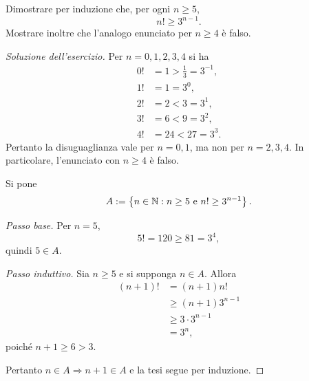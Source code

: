 \begin{exercise}
\label{ex:fondamenti-fattoriali-potenze}
Dimostrare per induzione che, per ogni $n\ge5$,
\[
  n!\ge3^{n-1}.
\]
Mostrare inoltre che l'analogo enunciato per $n\ge4$ è falso.
\end{exercise}
\begin{proof}[Soluzione dell'esercizio]
Per $n=0,1,2,3,4$ si ha
\[
\begin{aligned}
  0!&=1>\frac13=3^{-1},\\
  1!&=1=3^0,\\
  2!&=2<3=3^1,\\
  3!&=6<9=3^2,\\
  4!&=24<27=3^3.
\end{aligned}
\]
Pertanto la disuguaglianza vale per $n=0,1$,
ma non per $n=2,3,4$. In particolare,
l'enunciato con $n\ge4$ è falso.

Si pone
\[
  A:=\left\{n\in\N:n\ge5\ \text{e}\
  n!\ge3^{n-1}\right\}.
\]

\emph{Passo base.} Per $n=5$,
\[
  5!=120\ge81=3^4,
\]
quindi $5\in A$.

\emph{Passo induttivo.} Sia $n\ge5$ e si supponga $n\in A$. Allora
\[
\begin{aligned}
  (n+1)!
    &=(n+1)n!\\
    &\ge(n+1)3^{n-1}\\
    &\ge3\cdot3^{n-1}\\
    &=3^n,
\end{aligned}
\]
poiché $n+1\ge6>3$.

Pertanto $n\in A\Rightarrow n+1\in A$ e la tesi segue per induzione.
\end{proof}
